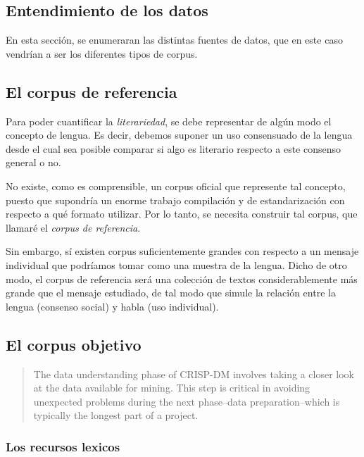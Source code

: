 \documentclass[twoside]{article}
\begin{document}
\subsection{Entendimiento de los datos}
\label{sec:orgb944827}

En esta sección, se enumeraran las distintas fuentes de datos,
que en este caso vendrían a ser los diferentes tipos de corpus.

\subsection{El corpus de referencia}
\label{sec:orgdb23a02}

Para poder cuantificar la \emph{literariedad}, se debe representar
de algún modo el concepto de lengua. Es decir, debemos suponer
un uso consensuado de la lengua desde el cual sea posible comparar
si algo es literario respecto a este consenso general o no.

No existe, como es comprensible, un corpus oficial que represente
tal concepto, puesto que supondría un enorme trabajo compilación
y de estandarización con respecto a qué formato utilizar. Por
lo tanto, se necesita construir tal corpus, que llamaré
el \emph{corpus de referencia}.

Sin embargo, sí existen corpus suficientemente grandes con
respecto a un mensaje individual que podríamos tomar
como una muestra de la lengua. Dicho de otro modo,
el corpus de referencia será una colección de textos
considerablemente más grande que el mensaje estudiado,
de tal modo que simule la relación entre la lengua (consenso social)
y habla (uso individual).


\subsection{El corpus objetivo}
\label{sec:org86d1202}


\begin{quote}
The data understanding phase of CRISP-DM involves taking a closer
look at the data available for mining. This step is critical in
avoiding unexpected problems during the next phase--data
preparation--which is typically the longest part of a project.
\end{quote}

\subsubsection{Los recursos lexicos}
\label{sec:orgf25daf9}
\end{document}
